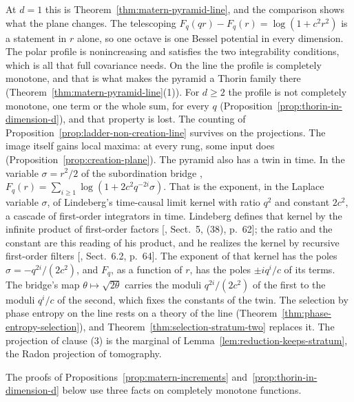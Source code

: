 At $d = 1$ this is Theorem~\ref{thm:matern-pyramid-line}, and the comparison shows what the plane
changes. The telescoping $F_q(qr) - F_q(r) = \log(1 + c^2r^2)$ is a statement in $r$ alone, so one
octave is one Bessel potential in every dimension. The polar profile is nonincreasing and satisfies
the two integrability conditions, which is all that full covariance needs. On the line the profile
is completely monotone, and that is what makes the \Matern{} pyramid a Thorin family there
(Theorem~\ref{thm:matern-pyramid-line}(1)). For $d \ge 2$ the profile is not completely monotone,
one term or the whole sum, for every $q$ (Proposition~\ref{prop:thorin-in-dimension-d}), and that
property is lost. The counting of Proposition~\ref{prop:ladder-non-creation-line} survives on the
projections. The image itself gains local maxima: at every rung, some input does
(Proposition~\ref{prop:creation-plane}). The pyramid also has a twin in time. In the variable
$\sigma = r^2/2$ of the subordination bridge ,
$F_q(r) = \sum_{i \ge 1}\log(1 + 2c^2q^{-2i}\sigma)$. That is the exponent, in the Laplace variable
$\sigma$, of Lindeberg's time-causal limit kernel with ratio $q^2$ and constant $2c^2$, a cascade of
first-order integrators in time. Lindeberg defines that kernel by the infinite product of
first-order factors [, Sect.~5, (38), p.~62]; the ratio and the constant
are this reading of his product, and he realizes the kernel by recursive first-order filters
[, Sect.~6.2, p.~64].
The exponent of that kernel has the poles $\sigma = -q^{2i}/(2c^2)$, and $F_q$, as a function of
$r$, has the poles $\pm iq^i/c$ of its terms. The bridge's map $\theta \mapsto \sqrt{2\theta}$
carries the moduli $q^{2i}/(2c^2)$ of the first to the moduli $q^i/c$ of the second, which fixes the
constants of the twin. The selection by phase entropy on the line rests on a
theory of the line (Theorem~\ref{thm:phase-entropy-selection}), and
Theorem~\ref{thm:selection-stratum-two} replaces it. The projection of clause (3) is the marginal of
Lemma~\ref{lem:reduction-keeps-stratum}, the Radon projection of tomography.

The proofs of Propositions~\ref{prop:matern-increments} and~\ref{prop:thorin-in-dimension-d} below
use three facts on completely monotone functions.

